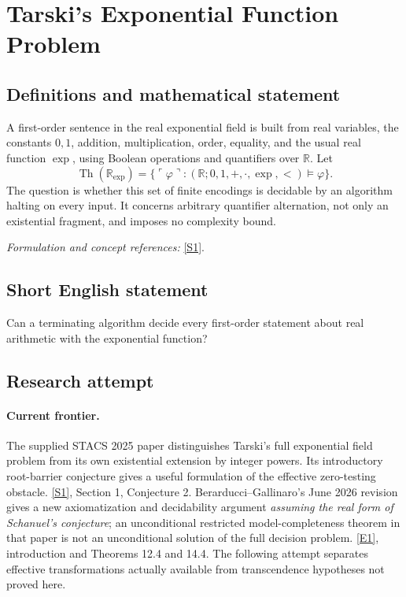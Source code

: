 \documentclass[11pt,a4paper]{article}
\newcommand{\R}{\mathbb{R}}
\newcommand{\sref}[2]{\hyperlink{source:#1:#2}{[S#2]}}
\newcommand{\eref}[2]{\hyperlink{extra:#1:#2}{[E#2]}}
\newif\ifshowcatalogue
\newcommand{\cataloguescope}[1]{\ifshowcatalogue
 \paragraph{Exact scope in the supplied catalogue.}
 \begin{quote}\small #1\end{quote}\fi}
\numberwithin{equation}{section}
\begin{document}
\setcounter{section}{0}
\clearpage
\section*{\texorpdfstring{Tarski's Exponential Function Problem}{Tarski's Exponential Function Problem}}\label{statement}
\subsection{Definitions and mathematical statement}
A first-order sentence in the real exponential field is built from real variables, the constants $0,1$, addition, multiplication, order, equality, and the usual real function $\exp$, using Boolean operations and quantifiers over $\R$. Let
\[
 \operatorname{Th}(\R_{\exp})=\{\ulcorner\varphi\urcorner:(\R;0,1,+,\cdot,\exp,<)\models\varphi\}.
\]
The question is whether this set of finite encodings is decidable by an algorithm halting on every input. It concerns arbitrary quantifier alternation, not only an existential fragment, and imposes no complexity bound.
\par\smallskip\textit{Formulation and concept references:} \sref{statement}{1}.
\cataloguescope{Determine whether the first-order theory of the real exponential field (R; 0, 1, +, *, exp, <, =) is decidable.}
\subsection{Short English statement}
Can a terminating algorithm decide every first-order statement about real arithmetic with the exponential function?
\subsection{Research attempt}

\paragraph{Current frontier.}
The supplied STACS 2025 paper distinguishes Tarski's full exponential
field problem from its own existential extension by integer powers.
Its introductory root-barrier conjecture gives a useful formulation of
the effective zero-testing obstacle. \sref{statement}{1}, Section 1,
Conjecture 2.
Berarducci--Gallinaro's June 2026 revision gives a new axiomatization and
decidability argument \emph{assuming the real form of Schanuel's
conjecture}; an unconditional restricted model-completeness theorem in
that paper is not an unconditional solution of the full decision
problem. \eref{statement}{1}, introduction and Theorems 12.4 and 14.4.
The following attempt separates effective transformations actually
available from transcendence hypotheses not proved here.
\end{document}
